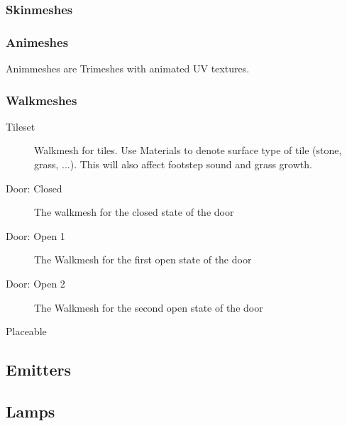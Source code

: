\subsubsection{Skinmeshes}

\subsubsection{Animeshes}
Animmeshes are Trimeshes with animated UV textures.

\subsubsection{Walkmeshes}
\begin{description}
    \item[Tileset] Walkmesh for tiles. Use Materials to denote surface type of
                   tile (stone, grass, ...). This will also affect footstep
                   sound and grass growth.
    \item[Door: Closed] The walkmesh for the closed state of the door
    \item[Door: Open 1] The Walkmesh for the first open state of the door
    \item[Door: Open 2] The Walkmesh for the second open state of the door
    \item[Placeable]
\end{description}

\subsection{Emitters}

\subsection{Lamps}
